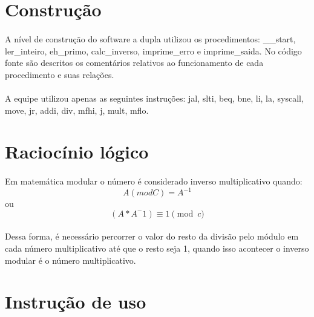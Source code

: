 \documentclass[a4paper, 12pt]{article}
\begin{document}
\section{Constru\c{c}\~ao}
\paragraph{}	A n\'ivel de constru\c{c}\~ao do software a dupla utilizou os procedimentos: \_\_start, ler\_inteiro, eh\_primo, calc\_inverso, imprime\_erro e imprime\_saida. No c\'odigo fonte s\~ao descritos os coment\'arios relativos ao funcionamento de cada procedimento e suas rela\c{c}\~oes.
\paragraph{}	A equipe utilizou apenas as seguintes instru\c{c}\~oes: jal, slti, beq, bne, li, la, syscall, move, jr, addi, div, mfhi, j, mult, mflo.

\section{Racioc\'inio l\'ogico} 
    \paragraph{}	Em matem\'atica modular o n\'umero \'e considerado inverso multiplicativo quando: \begin{equation} A(mod C) = A^{-1} \end{equation} ou  \begin{equation} (A * A^-1) \equiv 1 \pmod{c} \end{equation} 
    \paragraph{}	Dessa forma, \'e necess\'ario percorrer o valor do resto da divis\~ao pelo m\'odulo em cada n\'umero multiplicativo at\'e que o resto seja 1, quando isso acontecer o inverso modular \'e o n\'umero multiplicativo.
        
\section{Instru\c{c}\~ao de uso}
\end{document}
